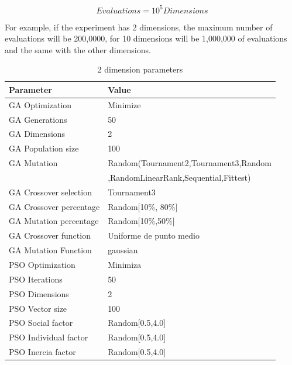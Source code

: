 \documentclass[runningheads]{llncs}
\begin{document}
\begin{equation}
    \label{eq:hesitancy-interpretation}
   Evaluations = 10^{5} Dimensions
   \end{equation}

   For example, if the experiment has 2 dimensions, the maximum number of
   evaluations will be 200,0000, for 10 dimensions will be 1,000,000 of evaluations
   and the same with the other dimensions.









   \begin{table}[htp]
    \caption{2 dimension parameters}
    \label{table:ga-pso-parameters-2}
    \centering
    \begin{tabular}{|l|l|}
    \hline
    Parameter & Value \\
    \hline
    \hline
    GA Optimization & Minimize \\
    \hline
    GA Generations & 50 \\
    \hline
    GA Dimensions & 2 \\
    \hline
    GA Population size & 100 \\
    \hline
    GA Mutation & Random(Tournament2,Tournament3,Random \\
    &  ,RandomLinearRank,Sequential,Fittest)\\
    \hline
    GA Crossover selection & Tournament3 \\
    \hline
    GA Crossover percentage & Random[10\%, 80\%] \\
    \hline
    GA Mutation percentage & Random[10\%,50\%] \\
    \hline
    GA Crossover function & Uniforme de punto medio \\
    \hline
    GA Mutation Function & gaussian \\
    \hline
    PSO Optimization & Minimiza \\
    \hline
    PSO Iterations & 50 \\
    \hline
    PSO Dimensions & 2 \\
    \hline
    PSO Vector size & 100 \\
    \hline
    PSO Social factor & Random[0.5,4.0] \\
    \hline
    PSO Individual factor & Random[0.5,4.0] \\
    \hline
    PSO Inercia factor & Random[0.5,4.0] \\
    \hline
    \end{tabular}
    \end{table}
\end{document}

